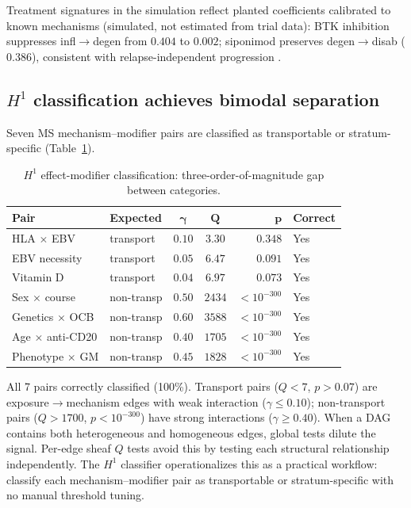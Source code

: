 \documentclass[11pt]{article}
\begin{document}
Treatment signatures in the simulation reflect planted coefficients calibrated to known mechanisms (simulated, not estimated from trial data): BTK inhibition suppresses infl$\to$degen from $0.404$ to $0.002$; siponimod preserves degen$\to$disab ($0.386$), consistent with relapse-independent progression \citep{kappos2018siponimod}.

\subsection{$H^1$ classification achieves bimodal separation}
\label{sec:res-h1}

Seven MS mechanism--modifier pairs are classified as transportable or stratum-specific (Table~\ref{tab:h1}).

\begin{table}[t]
\centering
\caption{$H^1$ effect-modifier classification: three-order-of-magnitude gap between categories.}
\label{tab:h1}
\small
\begin{tabular}{@{}llccrl@{}}
\toprule
\textbf{Pair} & \textbf{Expected} & $\boldsymbol{\gamma}$ & $\boldsymbol{Q}$ & $\boldsymbol{p}$ & \textbf{Correct} \\
\midrule
HLA $\times$ EBV & transport & $0.10$ & $3.30$ & $0.348$ & Yes \\
EBV necessity & transport & $0.05$ & $6.47$ & $0.091$ & Yes \\
Vitamin D & transport & $0.04$ & $6.97$ & $0.073$ & Yes \\
\midrule
Sex $\times$ course & non-transp & $0.50$ & $2434$ & $< 10^{-300}$ & Yes \\
Genetics $\times$ OCB & non-transp & $0.60$ & $3588$ & $< 10^{-300}$ & Yes \\
Age $\times$ anti-CD20 & non-transp & $0.40$ & $1705$ & $< 10^{-300}$ & Yes \\
Phenotype $\times$ GM & non-transp & $0.45$ & $1828$ & $< 10^{-300}$ & Yes \\
\bottomrule
\end{tabular}
\end{table}

All 7 pairs correctly classified (100\%).
Transport pairs ($Q < 7$, $p > 0.07$) are exposure$\to$mechanism edges with weak interaction ($\gamma \leq 0.10$); non-transport pairs ($Q > 1700$, $p < 10^{-300}$) have strong interactions ($\gamma \geq 0.40$).
When a DAG contains both heterogeneous and homogeneous edges, global tests dilute the signal.
Per-edge sheaf $Q$ tests avoid this by testing each structural relationship independently.
The $H^1$ classifier operationalizes this as a practical workflow: classify each mechanism--modifier pair as transportable or stratum-specific with no manual threshold tuning.
\end{document}

